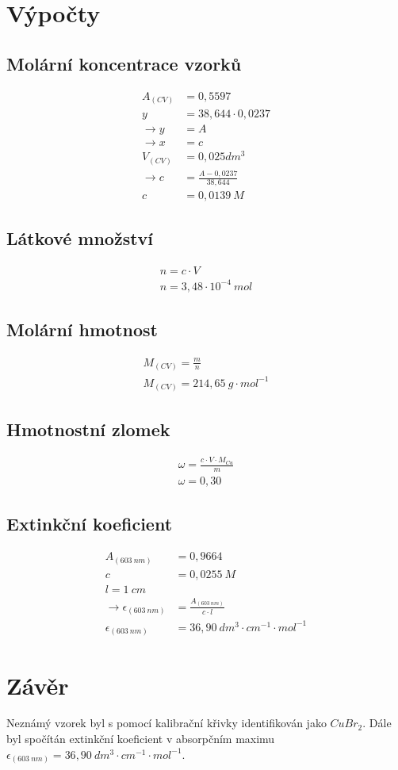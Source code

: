 \documentclass[13pt, a4paper, twoside]{article}
\begin{document}
    \section*{Výpočty}
    \subsection*{Molární koncentrace vzorků}
    \begin{align*}
        A_{(CV)} &= 0,5597 \\
        y &= 38,644 \cdot 0,0237 \\
        \to y&=A \\
        \to x&=c \\
        V_{(CV)} &= 0,025 dm^3 \\
        \to c&= \frac{A-0,0237}{38,644}\\
        c&=0,0139 \: M
    \end{align*}

    \subsection*{Látkové množství}
    \begin{align*}
        n=c\cdot V\\
        n=3,48 \cdot 10^{-4} \: mol
    \end{align*}

    \subsection*{Molární hmotnost}
    \begin{align*}
        M_{(CV)}=\frac{m}{n}\\
        M_{(CV)} = 214,65 \: g \cdot mol^{-1}
    \end{align*}

    \subsection*{Hmotnostní zlomek}
    \begin{align*}
        \omega = \frac{c\cdot V \cdot M_{Cu}}{m}\\
        \omega = 0,30
    \end{align*}

    \subsection*{Extinkční koeficient}
    \begin{align*}
        A_{(603\:nm)} &= 0,9664 \\
        c &= 0,0255\: M \\
        l = 1\: cm\\
        \to \epsilon_{(603\: nm)} &= \frac{A_{(603\:nm)}}{c \cdot l}\\
        \epsilon_{(603\: nm)} &= 36,90 \: dm^3 \cdot cm^{-1} \cdot mol^{-1}
    \end{align*}

    \section*{Závěr}
    Neznámý vzorek byl s pomocí kalibrační křivky identifikován jako $CuBr_2$. Dále byl spočítán extinkční koeficient v absorpčním maximu $\epsilon_{(603\: nm)} = 36,90 \: dm^3 \cdot cm^{-1} \cdot mol^{-1}$.
\end{document}
